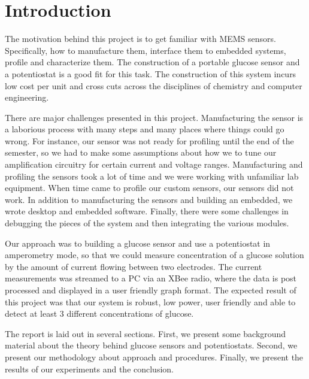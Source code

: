 \section{Introduction}
The motivation behind this project is to get familiar with MEMS sensors. Specifically, how to
manufacture them, interface them to embedded systems, profile and characterize them. The
construction of a portable glucose sensor and a potentiostat is a good fit for this task. The construction of this system
incurs low cost per unit and cross cuts across the disciplines of chemistry and computer engineering.

There are major challenges presented in this project. Manufacturing the sensor is a laborious process
with many steps and many places where things could go wrong. For instance, our sensor was not ready for
profiling until the end of the semester, so we had to make some assumptions about how we to tune
our amplification circuitry for certain current and voltage ranges. Manufacturing and profiling the sensors took a lot of time
and we were working with unfamiliar lab equipment. When time came to profile our custom sensors, our sensors did not work. In addition to manufacturing the sensors and building an embedded, we wrote
desktop and embedded software. Finally, there were some challenges in debugging the pieces of the system and then integrating the
various modules.

Our approach was to building a glucose sensor and use a potentiostat in amperometry mode, so that we could
measure concentration of a glucose solution by the amount of current flowing between two electrodes.
The current measurements was streamed to a PC via an XBee radio, where the data is post
processed and displayed in a user friendly graph format. The expected result of this project was that our system is robust, low power, user friendly and able to detect at least 3 different concentrations of glucose.

The report is laid out in several sections. First, we present some background material about the theory behind glucose sensors and potentiostats. Second, we present our methodology about approach and procedures. Finally, we present the results of our experiments and the conclusion.
